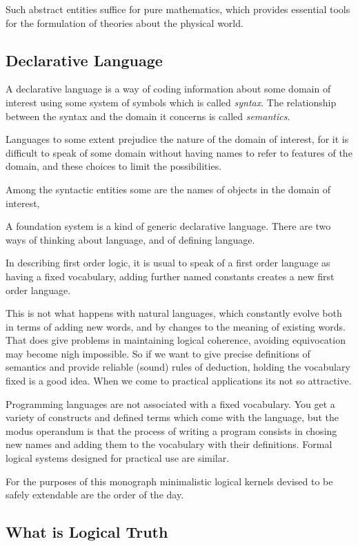 Such abstract entities suffice for pure mathematics, which provides essential tools for the formulation of theories about the physical world.

\subsection{Declarative Language}

A declarative language is a way of coding information about some domain of interest using some system of symbols which is called \emph{syntax}.
The relationship between the syntax and the domain it concerns is called \emph{semantics}.

Languages to some extent prejudice the nature of the domain of interest, for it is difficult to speak of some domain without having names to refer to features of the domain, and these choices to limit the possibilities.

Among the syntactic entities some are the names of objects in the domain of interest, 


A foundation system is a kind of generic declarative language.
There are two ways of thinking about language, and of defining language.

In describing first order logic, it is usual to speak of a first order language as having a fixed vocabulary, adding further named constants creates a new first order language.

This is not what happens with natural languages, which constantly evolve both in terms of adding new words, and by changes to the meaning of existing words.
That does give problems in maintaining logical coherence, avoiding equivocation may become nigh impossible.
So if we want to give precise definitions of semantics and provide reliable (sound) rules of deduction, holding the vocabulary fixed is a good idea.
When we come to practical applications its not so attractive.

Programming languages are not associated with a fixed vocabulary.
You get a variety of constructs and defined terms which come with the language, but the modus operandum is that the process of writing a program consists in chosing new names and adding them to the vocabulary with their definitions.
Formal logical systems designed for practical use are similar.

For the purposes of this monograph minimalistic logical kernels devised to be safely extendable are the order of the day.

\subsection{What is Logical Truth}


